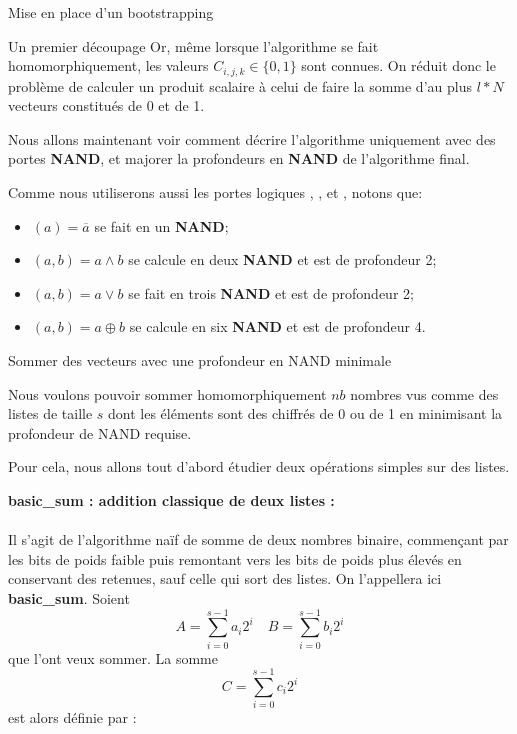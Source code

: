 \begin{section}{Mise en place d'un bootstrapping}
\begin{subsection}{Un premier découpage}
	Or, même lorsque l'algorithme se fait homomorphiquement, les valeurs $C_{i,j,k} \in \{ 0,1 \}$ sont connues. On réduit donc le problème de calculer un produit scalaire à celui de faire la somme d'au plus $l * N$ vecteurs constitués de 0 et de 1.

	Nous allons maintenant voir comment décrire l'algorithme uniquement avec des portes \textbf{NAND}, et majorer la profondeurs en \textbf{NAND} de l'algorithme final.

	Comme nous utiliserons aussi les portes logiques , ,  et , notons que:
\begin{itemize}
\item {}$(a) = \overline{a}$ se fait en un \textbf{NAND};
\item {}$(a, b) = a \land b$ se calcule en deux \textbf{NAND} et est de
	profondeur 2;
\item {}$(a, b) = a \lor b$ se fait en trois \textbf{NAND} et est de
	profondeur 2;
\item {}$(a, b) = a \oplus b$ se calcule en six \textbf{NAND} et est de
	profondeur 4.
\end{itemize}

\end{subsection}
\begin{subsection}{Sommer des vecteurs avec une profondeur en NAND minimale}

	Nous voulons pouvoir sommer homomorphiquement $nb$ nombres vus comme des listes de taille $s$ dont les éléments sont des chiffrés de 0 ou de 1 en minimisant la profondeur de NAND requise. 

	Pour cela, nous allons tout d'abord étudier deux opérations simples sur des listes.


\vspace{0.3cm}
\noindent
\textbf{basic\_sum : addition classique de deux listes :}
\paragraph{}
	Il s'agit de l'algorithme naïf de somme de deux nombres binaire, commençant par les bits de poids faible puis remontant vers les bits de poids plus élevés en conservant des retenues, sauf celle qui \og sort \fg des listes. On l'appellera ici \textbf{basic\_sum}. Soient 
\[ A = \sum_{i=0}^{s-1} a_i 2^i \quad B = \sum_{i=0}^{s-1} b_i 2^i\]
que l'ont veux sommer. La somme
\[C =\sum_{i=0}^{s-1} c_i 2^i\]
est alors définie par :
	

\end{subsection}
\end{section}
